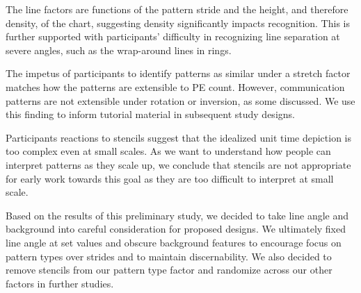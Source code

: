 The line factors are functions of the pattern stride and the height, and therefore density, of the chart, suggesting density significantly impacts recognition. This is further supported with participants' difficulty in recognizing line separation at severe angles, such as the wrap-around lines in rings.

The impetus of participants to identify patterns as similar under a stretch factor matches how the patterns are extensible to PE count. However, communication patterns are not extensible under rotation or inversion, as some discussed. We use this finding to inform tutorial material in subsequent study designs.

Participants reactions to stencils suggest that the idealized unit time depiction is too complex even at small scales. As we want to understand how people can interpret patterns as they scale up, we conclude that stencils are not appropriate for early work towards this goal as they are too difficult to interpret at small scale.

Based on the results of this preliminary study, we decided to take line angle and background into careful consideration for proposed designs. We ultimately fixed line angle at set values and obscure background features to encourage focus on pattern types over strides and to maintain discernability. We also decided to remove stencils from our pattern type factor and randomize across our other factors in further studies.